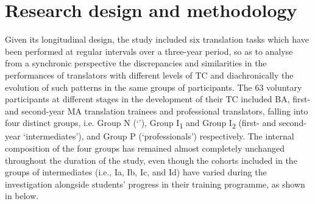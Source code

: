 \documentclass[output=paper]{LSP/langsci}
\begin{document}
\section{Research design and methodology}

Given its longitudinal design, the study included six translation tasks which have been performed at regular intervals over a three-year period, so as to analyse from a synchronic perspective the discrepancies and similarities in the performances of translators with different levels of TC and  diachronically the evolution of such patterns in the same groups of participants. The 63 voluntary participants at different stages in the development of their TC included BA, first- and second-year MA translation trainees and professional translators, falling into four distinct groups, i.e. Group N (`'), Group I\textsubscript{1} and Group I\textsubscript{2} (first- and second-year `intermediates'), and Group P (`professionals') respectively. The internal composition of the four groups has remained almost completely unchanged throughout the duration of the study, even though the cohorts included in the groups of intermediates (i.e., Ia, Ib, Ic, and Id) have varied during the investigation alongside students' progress in their training programme, as shown in  below.
\end{document}
